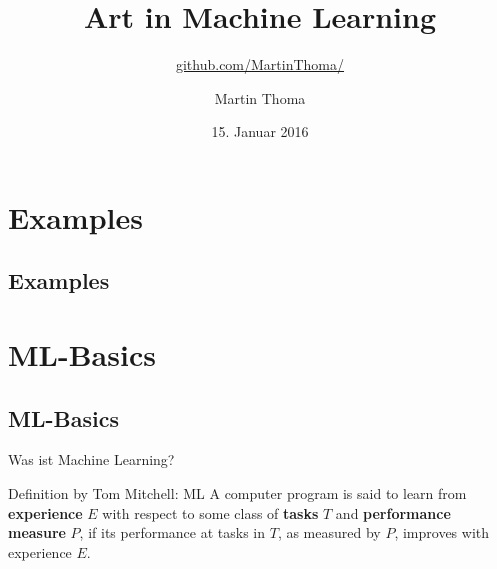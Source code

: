 \documentclass[hyperref={pdfpagelabels=false},usepdftitle=false]{beamer}
\begin{document}
\title{Art in Machine Learning}
\subtitle{\href{https://github.com/MartinThoma/}{github.com/MartinThoma/}}
\author{Martin Thoma}
\date{15. Januar 2016}
\subject{Machine Learning}

\frame{\titlepage}

\section{Examples}
\subsection{Examples}


\section{ML-Basics}
\subsection{ML-Basics}

\begin{frame}{Was ist Machine Learning?}
    \begin{block}{Definition by Tom Mitchell: ML}
        A computer program is said to learn from \textbf{experience} $E$ with
        respect to some class of \textbf{tasks} $T$ and \textbf{performance
        measure} $P$, if its performance at tasks in $T$, as measured by $P$,
        improves with experience $E$.
    \end{block}
\end{frame}
\end{document}
